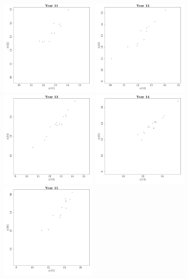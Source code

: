 \documentclass{article}\usepackage[]{graphicx}\usepackage[]{color}
\newenvironment{knitrout}{}{} %
\begin{document}
\begin{knitrout}
\includegraphics[width=0.35\textwidth]{figure/Reshaping11} 
\includegraphics[width=0.35\textwidth]{figure/Reshaping12} 
\includegraphics[width=0.35\textwidth]{figure/Reshaping13} 
\includegraphics[width=0.35\textwidth]{figure/Reshaping14} 
\includegraphics[width=0.35\textwidth]{figure/Reshaping15} 

\end{knitrout}
\end{document}
